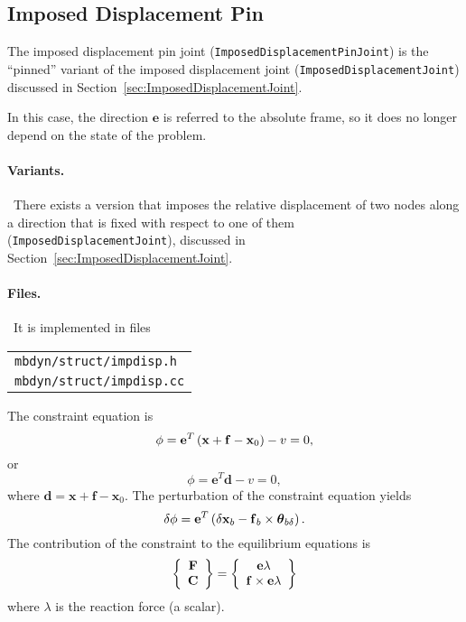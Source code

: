 \documentclass[10pt,dvips,fleqn,subeqn]{report}
\newcommand{\T}[1]{\bm{\mathbf{#1}}}
\begin{document}
\subsection{Imposed Displacement Pin}
\label{sec:ImposedDisplacementPinJoint}
The imposed displacement pin joint (\texttt{ImposedDisplacementPinJoint}) 
is the ``pinned'' variant of the imposed displacement joint
(\texttt{ImposedDisplacementJoint}) discussed
in Section~\ref{sec:ImposedDisplacementJoint}.

In this case, the direction $\T{e}$ is referred to the absolute frame,
so it does no longer depend on the state of the problem.

\paragraph{Variants.} \
There exists a version that imposes the relative displacement of two nodes
along a direction that is fixed with respect to one of them 
(\texttt{ImposedDisplacementJoint}),
discussed in Section~\ref{sec:ImposedDisplacementJoint}.

\paragraph{Files.} \
It is implemented in files

\begin{tabular}{l}
\texttt{mbdyn/struct/impdisp.h} \\
\texttt{mbdyn/struct/impdisp.cc}
\end{tabular}

The constraint equation is
\begin{equation}
	\phi = \T{e}^T \plbr{\T{x} + \T{f} - \T{x}_0} - v = 0 ,
\end{equation}
or
\begin{equation}
	\phi = \T{e}^T \T{d} - v = 0 ,
\end{equation}
where $\T{d}=\T{x} + \T{f} - \T{x}_0$.
The perturbation of the constraint equation yields
\begin{equation}
	\delta\phi = 
		\T{e}^T \plbr{\delta\T{x}_b
		- \T{f}_b\times\T{\theta}_{b\delta}
		} .
\end{equation}
The contribution of the constraint to the equilibrium equations is
\begin{equation}
	\cubr{\cvvect{
		\T{F} \\
		\T{C}
	}} = \cubr{\cvvect{
		\T{e} \lambda \\
		\T{f} \times \T{e} \lambda
	}}
\end{equation}
where $\lambda$ is the reaction force (a scalar).
\end{document}

